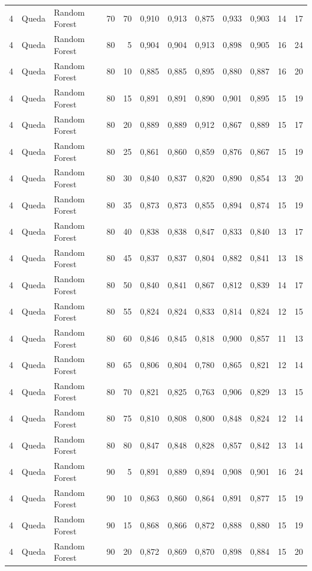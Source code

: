 \begin{longtable}{@{}rllrrrrrrrrr@{}}
4 & Queda & Random Forest & 70 & 70 & 0,910 & 0,913 & 0,875 & 0,933 & 0,903 & 14 & 17 \\
4 & Queda & Random Forest & 80 & 5 & 0,904 & 0,904 & 0,913 & 0,898 & 0,905 & 16 & 24 \\
4 & Queda & Random Forest & 80 & 10 & 0,885 & 0,885 & 0,895 & 0,880 & 0,887 & 16 & 20 \\
4 & Queda & Random Forest & 80 & 15 & 0,891 & 0,891 & 0,890 & 0,901 & 0,895 & 15 & 19 \\
4 & Queda & Random Forest & 80 & 20 & 0,889 & 0,889 & 0,912 & 0,867 & 0,889 & 15 & 17 \\
4 & Queda & Random Forest & 80 & 25 & 0,861 & 0,860 & 0,859 & 0,876 & 0,867 & 15 & 19 \\
4 & Queda & Random Forest & 80 & 30 & 0,840 & 0,837 & 0,820 & 0,890 & 0,854 & 13 & 20 \\
4 & Queda & Random Forest & 80 & 35 & 0,873 & 0,873 & 0,855 & 0,894 & 0,874 & 15 & 19 \\
4 & Queda & Random Forest & 80 & 40 & 0,838 & 0,838 & 0,847 & 0,833 & 0,840 & 13 & 17 \\
4 & Queda & Random Forest & 80 & 45 & 0,837 & 0,837 & 0,804 & 0,882 & 0,841 & 13 & 18 \\
4 & Queda & Random Forest & 80 & 50 & 0,840 & 0,841 & 0,867 & 0,812 & 0,839 & 14 & 17 \\
4 & Queda & Random Forest & 80 & 55 & 0,824 & 0,824 & 0,833 & 0,814 & 0,824 & 12 & 15 \\
4 & Queda & Random Forest & 80 & 60 & 0,846 & 0,845 & 0,818 & 0,900 & 0,857 & 11 & 13 \\
4 & Queda & Random Forest & 80 & 65 & 0,806 & 0,804 & 0,780 & 0,865 & 0,821 & 12 & 14 \\
4 & Queda & Random Forest & 80 & 70 & 0,821 & 0,825 & 0,763 & 0,906 & 0,829 & 13 & 15 \\
4 & Queda & Random Forest & 80 & 75 & 0,810 & 0,808 & 0,800 & 0,848 & 0,824 & 12 & 14 \\
4 & Queda & Random Forest & 80 & 80 & 0,847 & 0,848 & 0,828 & 0,857 & 0,842 & 13 & 14 \\
4 & Queda & Random Forest & 90 & 5 & 0,891 & 0,889 & 0,894 & 0,908 & 0,901 & 16 & 24 \\
4 & Queda & Random Forest & 90 & 10 & 0,863 & 0,860 & 0,864 & 0,891 & 0,877 & 15 & 19 \\
4 & Queda & Random Forest & 90 & 15 & 0,868 & 0,866 & 0,872 & 0,888 & 0,880 & 15 & 19 \\
4 & Queda & Random Forest & 90 & 20 & 0,872 & 0,869 & 0,870 & 0,898 & 0,884 & 15 & 20 \\

\end{longtable}
